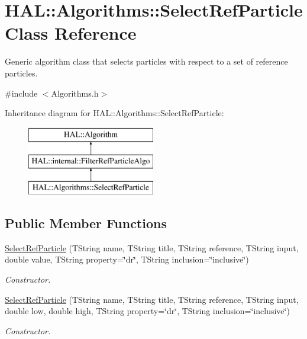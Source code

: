 \hypertarget{class_h_a_l_1_1_algorithms_1_1_select_ref_particle}{\section{H\+A\+L\+:\+:Algorithms\+:\+:Select\+Ref\+Particle Class Reference}
\label{class_h_a_l_1_1_algorithms_1_1_select_ref_particle}
}


Generic algorithm class that selects particles with respect to a set of reference particles.  




{\ttfamily \#include $<$Algorithms.\+h$>$}

Inheritance diagram for H\+A\+L\+:\+:Algorithms\+:\+:Select\+Ref\+Particle\+:\begin{figure}[H]
\begin{center}
\leavevmode
\includegraphics[height=3.000000cm]{class_h_a_l_1_1_algorithms_1_1_select_ref_particle}
\end{center}
\end{figure}
\subsection*{Public Member Functions}
\begin{DoxyCompactItemize}
\item 
\hyperlink{class_h_a_l_1_1_algorithms_1_1_select_ref_particle_af0c5f5e66e54f7bc102e32148867892e}{Select\+Ref\+Particle} (T\+String name, T\+String title, T\+String reference, T\+String input, double value, T\+String property=\char`\"{}dr\char`\"{}, T\+String inclusion=\char`\"{}inclusive\char`\"{})
\begin{DoxyCompactList}\small\item\em Constructor. \end{DoxyCompactList}\item 
\hyperlink{class_h_a_l_1_1_algorithms_1_1_select_ref_particle_a68f9c3c857223c9a84b73e1569cdecaf}{Select\+Ref\+Particle} (T\+String name, T\+String title, T\+String reference, T\+String input, double low, double high, T\+String property=\char`\"{}dr\char`\"{}, T\+String inclusion=\char`\"{}inclusive\char`\"{})
\begin{DoxyCompactList}\small\item\em Constructor. \end{DoxyCompactList}\end{DoxyCompactItemize}
